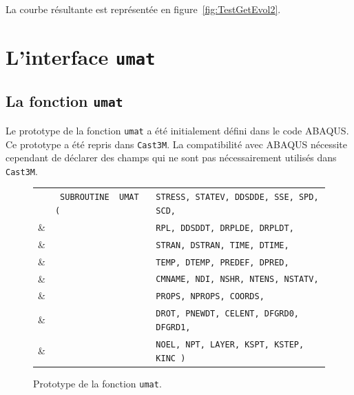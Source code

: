 \documentclass[rectoverso,pleiades,pstricks,leqno,anti]{texmf/note_technique_2010}
\newcommand{\castem}{\texttt{Cast3M}}
\begin{document}
La courbe résultante est représentée en figure~\ref{fig:TestGetEvol2}.

\clearpage
\newpage
\section{L'interface {\tt umat}}
\label{sec:utilisation_umat}

\subsection{La fonction {\tt umat}}

Le prototype de la fonction {\tt umat} a été initialement défini dans le
code ABAQUS. Ce prototype a été repris dans \castem{}. La compatibilité
avec ABAQUS nécessite cependant de déclarer des champs qui ne sont pas
nécessairement utilisés dans \castem{}.

\begin{figure}[htbp]
  \centering
  \begin{tabular}[htbp]{lll}
    & {\tt {\color{purple} SUBROUTINE} {\color{green} UMAT} ( }&{\tt  STRESS, STATEV, DDSDDE, SSE, SPD, SCD,}\\
    {\color{ceabluecurve} \&} &                   & {\tt RPL, DDSDDT, DRPLDE, DRPLDT,}\\
    {\color{ceabluecurve} \&} &                   & {\tt STRAN, DSTRAN, TIME, DTIME,}\\
    {\color{ceabluecurve} \&} &                   & {\tt TEMP, DTEMP, PREDEF, DPRED,}\\
    {\color{ceabluecurve} \&} &                   & {\tt CMNAME, NDI, NSHR, NTENS, NSTATV,}\\
    {\color{ceabluecurve} \&} &                   & {\tt PROPS, NPROPS, COORDS,}\\
    {\color{ceabluecurve} \&} &                   & {\tt DROT, PNEWDT, CELENT, DFGRD0, DFGRD1,}\\
    {\color{ceabluecurve} \&} &                   & {\tt NOEL, NPT, LAYER, KSPT, KSTEP, KINC )}\\
   \end{tabular}
  \caption{Prototype de la fonction {\tt umat}.}
  \label{fig:umat:prototype}
\end{figure}
\end{document}
